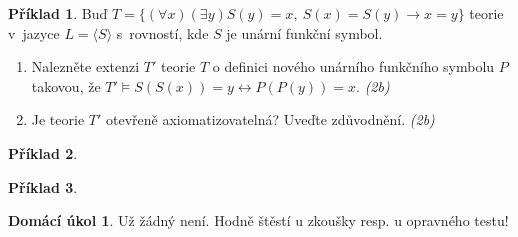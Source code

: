 \documentclass[a4paper]{article}
\theoremstyle{definition}
\newtheorem{problem}{Příklad}
\newtheorem*{ukol}{Domácí úkol}
\begin{document}
\medskip\begin{problem} %
    Buď $T=\{(\forall x)(\exists y) S(y)=x,\ S(x)=S(y)\to x=y\}$ teorie v~jazyce $L=\langle S\rangle$ s~rovností, kde $S$ je unární funkční symbol.
    \begin{enumerate}
    \item Nalezněte extenzi $T'$ teorie $T$ o definici nového unárního funkčního symbolu $P$ takovou, že $T' \models S(S(x))=y \leftrightarrow P(P(y))=x$. {\it (2b)}
    \item Je teorie $T'$ otevřeně axiomatizovatelná? Uveďte zdůvodnění. {\it (2b)}
    \end{enumerate} 
\end{problem} 





\medskip\begin{problem}
 
\end{problem}


\medskip\begin{problem}
 
\end{problem}



\medskip\begin{ukol}
Už žádný není. Hodně štěstí u zkoušky resp. u opravného testu!
\end{ukol}
\end{document}
